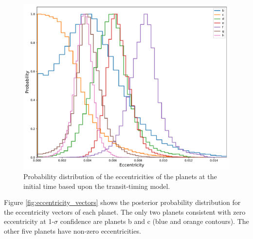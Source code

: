 \documentclass[twocolumn]{aastex63}
\begin{document}
\begin{figure}
    \centering
    \includegraphics[width=\hsize]{figures/eccentricity_posterior.pdf}
    \caption{Probability distribution of the eccentricities of the planets at the initial time
    based upon the transit-timing model.}
    \label{fig:eccentricity_posterior}
\end{figure}


Figure \ref{fig:eccentricity_vectors} shows the posterior probability distribution 
for the eccentricity vectors of each planet.  The only two planets consistent with 
zero eccentricity at 1-$\sigma$ confidence are planets b and
c (blue and orange contours).  The other five planets have non-zero eccentricities.
\end{document}
